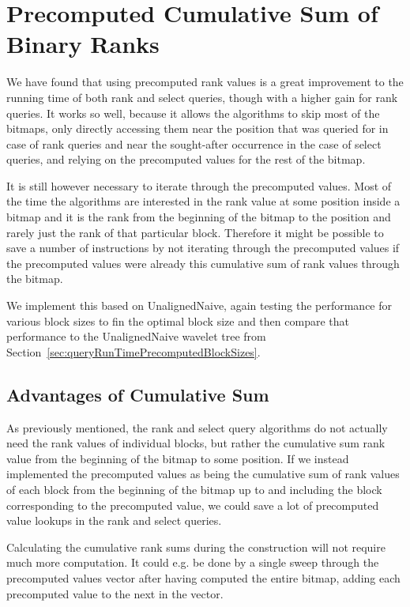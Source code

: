 \section{Precomputed Cumulative Sum of Binary Ranks}
We have found that using precomputed rank values is a great improvement to the running time of both rank and select queries, though with a higher gain for rank queries.
It works so well, because it allows the algorithms to skip most of the bitmaps, only directly accessing them near the position that was queried for in case of rank queries and near the sought-after occurrence in the case of select queries, and relying on the precomputed values for the rest of the bitmap.

It is still however necessary to iterate through the precomputed values.
Most of the time the algorithms are interested in the rank value at some position inside a bitmap and it is the rank from the beginning of the bitmap to the position and rarely just the rank of that particular block.
Therefore it might be possible to save a number of instructions by not iterating through the precomputed values if the precomputed values were already this cumulative sum of rank values through the bitmap.

We implement this based on UnalignedNaive, again testing the performance for various block sizes to fin the optimal block size and then compare that performance to the UnalignedNaive wavelet tree from Section~\ref{sec:queryRunTimePrecomputedBlockSizes}.

\subsection{Advantages of Cumulative Sum}
As previously mentioned, the rank and select query algorithms do not actually need the rank values of individual blocks, but rather the cumulative sum rank value from the beginning of the bitmap to some position.
If we instead implemented the precomputed values as being the cumulative sum of rank values of each block from the beginning of the bitmap up to and including the block corresponding to the precomputed value, we could save a lot of precomputed value lookups in the rank and select queries.

Calculating the cumulative rank sums during the construction will not require much more computation.
It could e.g. be done by a single sweep through the precomputed values vector after having computed the entire bitmap, adding each precomputed value to the next in the vector.

